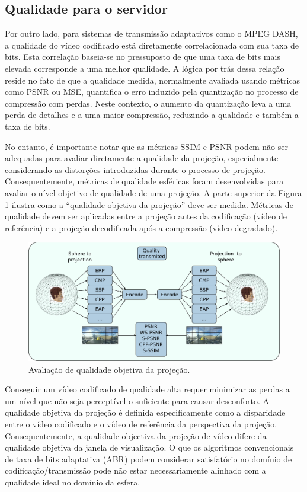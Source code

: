 \subsection{Qualidade para o servidor}

Por outro lado, para sistemas de transmissão adaptativos como o MPEG DASH, a qualidade do vídeo codificado está diretamente correlacionada com sua taxa de bits. Esta correlação baseia-se no pressuposto de que uma taxa de bits mais elevada corresponde a uma melhor qualidade. A lógica por trás dessa relação reside no fato de que a qualidade medida, normalmente avaliada usando métricas como PSNR ou MSE, quantifica o erro induzido pela quantização no processo de compressão com perdas. Neste contexto, o aumento da quantização leva a uma perda de detalhes e a uma maior compressão, reduzindo a qualidade e também a taxa de bits.

No entanto, é importante notar que as métricas SSIM e PSNR podem não ser adequadas para avaliar diretamente a qualidade da projeção, especialmente considerando as distorções introduzidas durante o processo de projeção. Consequentemente, métricas de qualidade esféricas foram desenvolvidas para avaliar o nível objetivo de qualidade de uma projeção. A parte superior da Figura \ref{fig:QualityDiagram} ilustra como a “qualidade objetiva da projeção” deve ser medida. Métricas de qualidade devem ser aplicadas entre a projeção antes da codificação (vídeo de referência) e a projeção decodificada após a compressão (vídeo degradado).

\begin{figure}[h]
        \centering
        \includegraphics[width=0.7\linewidth]{fig/diagrama e qualidade 1.png}
        \caption{Avaliação de qualidade objetiva da projeção.}
        \label{fig:QualityDiagram}
\end{figure}

Conseguir um vídeo codificado de qualidade alta requer minimizar as perdas a um nível que não seja perceptível o suficiente para causar desconforto. A qualidade objetiva da projeção é definida especificamente como a disparidade entre o vídeo codificado e o vídeo de referência da perspectiva da projeção. Consequentemente, a qualidade objectiva da projeção de vídeo difere da qualidade objetiva da janela de visualização. O que os algoritmos convencionais de taxa de bits adaptativa (ABR) podem considerar satisfatório no domínio de codificação/transmissão pode não estar necessariamente alinhado com a qualidade ideal no domínio da esfera.

